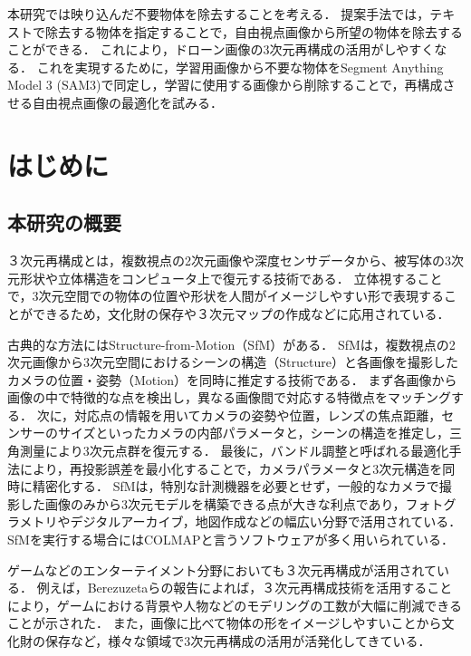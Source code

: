 \documentclass[a4paper,dvipdfmx,ja=standard,9pt]{bxjsarticle}
\begin{document}
本研究では映り込んだ不要物体を除去することを考える．
提案手法では，テキストで除去する物体を指定することで，自由視点画像から所望の物体を除去することができる．
これにより，ドローン画像の3次元再構成の活用がしやすくなる．
これを実現するために，学習用画像から不要な物体をSegment Anything Model 3 (SAM3)で同定し，学習に使用する画像から削除することで，再構成させる自由視点画像の最適化を試みる．



\newpage
\setcounter{tocdepth}{3}  %
\tableofcontents

\newpage
\section{はじめに}
\subsection{本研究の概要}
%

３次元再構成とは，複数視点の2次元画像や深度センサデータから、被写体の3次元形状や立体構造をコンピュータ上で復元する技術である．
立体視することで，3次元空間での物体の位置や形状を人間がイメージしやすい形で表現することができるため，文化財の保存や３次元マップの作成などに応用されている．

古典的な方法にはStructure-from-Motion（SfM）\cite{snavely2006photo}がある．
SfMは，複数視点の2次元画像から3次元空間におけるシーンの構造（Structure）と各画像を撮影したカメラの位置・姿勢（Motion）を同時に推定する技術である．
まず各画像から画像の中で特徴的な点を検出し，異なる画像間で対応する特徴点をマッチングする．
次に，対応点の情報を用いてカメラの姿勢や位置，レンズの焦点距離，センサーのサイズといったカメラの内部パラメータと，シーンの構造を推定し，三角測量により3次元点群を復元する．
最後に，バンドル調整と呼ばれる最適化手法により，再投影誤差を最小化することで，カメラパラメータと3次元構造を同時に精密化する．
SfMは，特別な計測機器を必要とせず，一般的なカメラで撮影した画像のみから3次元モデルを構築できる点が大きな利点であり，フォトグラメトリやデジタルアーカイブ，地図作成などの幅広い分野で活用されている．
SfMを実行する場合にはCOLMAP\cite{schoenberger2016colmap}と言うソフトウェアが多く用いられている．

ゲームなどのエンターテイメント分野においても３次元再構成が活用されている．
例えば，Berezuzetaら\cite{berrezueta2025from}の報告によれば，３次元再構成技術を活用することにより，ゲームにおける背景や人物などのモデリングの工数が大幅に削減できることが示された．
また，画像に比べて物体の形をイメージしやすいことから文化財の保存\cite{gomes20143d}など，様々な領域で3次元再構成の活用が活発化してきている．
\end{document}
